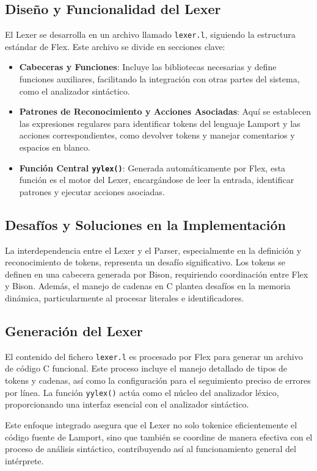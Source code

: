 \subsection{Diseño y Funcionalidad del Lexer}
El Lexer se desarrolla en un archivo llamado \texttt{lexer.l}, siguiendo la estructura estándar de Flex. Este archivo se divide en secciones clave:

\begin{itemize}
    \item \textbf{Cabeceras y Funciones}: Incluye las bibliotecas necesarias y define funciones auxiliares, facilitando la integración con otras partes del sistema, como el analizador sintáctico.
    \item \textbf{Patrones de Reconocimiento y Acciones Asociadas}: Aquí se establecen las expresiones regulares para identificar tokens del lenguaje Lamport y las acciones correspondientes, como devolver tokens y manejar comentarios y espacios en blanco.
    \item \textbf{Función Central \texttt{yylex()}}: Generada automáticamente por Flex, esta función es el motor del Lexer, encargándose de leer la entrada, identificar patrones y ejecutar acciones asociadas.
\end{itemize}

\subsection{Desafíos y Soluciones en la Implementación}
La interdependencia entre el Lexer y el Parser, especialmente en la definición y reconocimiento de tokens, representa un desafío significativo. Los tokens se definen en una cabecera generada por Bison, requiriendo coordinación entre Flex y Bison. Además, el manejo de cadenas en C plantea desafíos en la memoria dinámica, particularmente al procesar literales e identificadores.

\subsection{Generación del Lexer}
El contenido del fichero \texttt{lexer.l} es procesado por Flex para generar un archivo de código C funcional. Este proceso incluye el manejo detallado de tipos de tokens y cadenas, así como la configuración para el seguimiento preciso de errores por línea. La función \texttt{yylex()} actúa como el núcleo del analizador léxico, proporcionando una interfaz esencial con el analizador sintáctico.

Este enfoque integrado asegura que el Lexer no solo tokenice eficientemente el código fuente de Lamport, sino que también se coordine de manera efectiva con el proceso de análisis sintáctico, contribuyendo así al funcionamiento general del intérprete.
